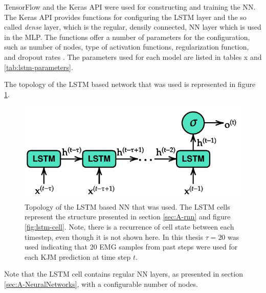 \documentclass[../main.tex]{subfiles}
\begin{document}
TensorFlow \cite{tensorflow2015-whitepaper} and the Keras API \cite{chollet2015keras} were used for constructing and training the \ac{NN}.
The Keras API provides functions for configuring the \ac{LSTM} layer and the so called \textit{dense} layer, which is the regular, densily connected, \ac{NN} layer which is used in the \ac{MLP}.
The functions offer a number of parameters for the configuration, such as number of nodes, type of activation functions, regularization function, and dropout rates \cite{chollet2015keras}.
The parameters used for each model are listed in tables x and \ref{tab:lstm-parameters}.

The topology of the \ac{LSTM} based network that was used is represented in figure \ref{fig:lstm-model-used}.
\begin{figure}[ht!]
    \centering
    \includegraphics{img/LSTM_model_used.pdf}
    \caption{Topology of the \ac{LSTM} based \ac{NN} that was used. The \ac{LSTM} cells represent the structure presented in section \ref{sec:A-rnn} and figure \ref{fig:lstm-cell}. Note, there is a recurrence of cell state between each timestep, even though it is not shown here. In this thesis $\tau = 20$ was used indicating that 20 \ac{EMG} samples from past steps were used for each \ac{KJM} prediction at time step $t$.}
    \label{fig:lstm-model-used}
\end{figure}
Note that the \ac{LSTM} cell contains regular \ac{NN} layers, as presented in section \ref{sec:A-NeuralNetworks}, with a configurable number of nodes.

\end{document}
